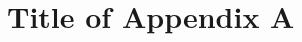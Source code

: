 \documentclass[12pt,leqno]{ksudiss}
\begin{document}


\appendix
\chapter{Title of Appendix A}
\setcounter{figure}{0}
\setcounter{table}{0}
\setcounter{equation}{0}




%
\begin{thebibliography}{100}

\end{thebibliography}



%
\end{document}
